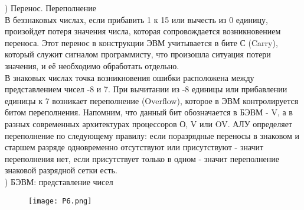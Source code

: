 ) Перенос. Переполнение \\
В беззнаковых числах, если прибавить 1 к 15 или вычесть из 0 единицу, произойдет потеря значения числа, которая сопровождается возникновением переноса. Этот перенос в конструкции ЭВМ учитывается в бите С (Carry), который служит сигналом программисту, что произошла ситуация потери значения, и её необходимо обработать отдельно. \\
В знаковых числах точка возникновения ошибки расположена между представлением чисел -8 и 7. При вычитании из -8 единицы или прибавлении единицы к 7 возникает переполнение (Overflow), которое в ЭВМ контролируется битом переполнения. Напомним, что данный бит обозначается в БЭВМ - V, а в разных современных архитектурах процессоров О, V или OV. АЛУ определяет переполнение по следующему правилу: если поразрядные переносы в знаковом и старшем разряде одновременно отсутствуют или присутствуют - значит переполнения нет, если присутствует только в одном - значит переполнение знаковой разрядной сетки есть. \\

) БЭВМ: представление чисел \\
\begin{figure}[H]
    \centering
    \texttt{[image: P6.png]}
\end{figure}

